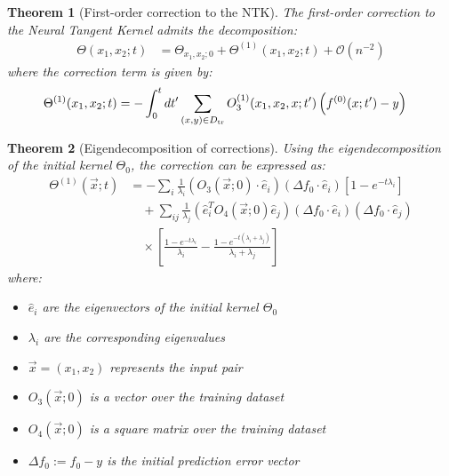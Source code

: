 \documentclass[11pt,a4paper]{article}
\newtheorem{theorem}{Theorem}[section]
\theoremstyle{definition}
\begin{document}
\begin{theorem}[First-order correction to the NTK]\label{thm:corrections}
The first-order correction to the Neural Tangent Kernel admits the decomposition:
\begin{align}
\Theta(x_1,x_2;t) &= \Theta_{x_1,x_2;0} + \Theta^{(1)}(x_1,x_2;t) + \mathcal{O}(n^{-2}) \label{eq:theta_expansion}
\end{align}
where the correction term is given by:
\begin{align}
\Theta^{(1)}(x_1,x_2;t) &= -\int_{0}^{t}dt'\sum_{(x,y)\in D_{\rm tr}}O^{(1)}_{3}(x_1,x_2,x;t')\left(f^{(0)}(x;t')-y\right) \label{eq:theta_correction}
\end{align}
\end{theorem}

\begin{theorem}[Eigendecomposition of corrections]\label{thm:eigen_corrections}
Using the eigendecomposition of the initial kernel $\Theta_0$, the correction can be expressed as:
\begin{align}
\Theta^{(1)}(\vec{x};t) &= -\sum_{i}\frac{1}{\lambda_{i}}(O_{3}(\vec{x};0)\cdot\hat{e}_{i})(\Delta f_{0}\cdot\hat{e}_{i})\left[1-e^{-t\lambda_{i}}\right] \nonumber\\
&\quad +\sum_{ij}\frac{1}{\lambda_{j}}(\hat{e}_{i}^{T}O_{4}(\vec{x};0)\hat{e}_{j})(\Delta f_{0}\cdot \hat{e}_{i})(\Delta f_{0}\cdot \hat{e}_{j}) \nonumber\\
&\quad \times \left[\frac{1-e^{-t\lambda_{i}}}{\lambda_{i}}-\frac{1-e^{-t(\lambda_{i}+\lambda_{j})}}{\lambda_{i}+\lambda_{j}}\right] \label{eq:eigen_expansion}
\end{align}
where:
\begin{itemize}
\item $\hat{e}_{i}$ are the eigenvectors of the initial kernel $\Theta_{0}$
\item $\lambda_{i}$ are the corresponding eigenvalues
\item $\vec{x} = (x_1,x_2)$ represents the input pair
\item $O_{3}(\vec{x};0)$ is a vector over the training dataset
\item $O_{4}(\vec{x};0)$ is a square matrix over the training dataset
\item $\Delta f_{0} := f_{0} - y$ is the initial prediction error vector
\end{itemize}
\end{theorem}
\end{document}
